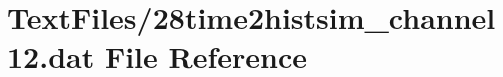 \hypertarget{28time2histsim__channel12_8dat}{}\section{Text\+Files/28time2histsim\+\_\+channel12.dat File Reference}
\label{28time2histsim__channel12_8dat}
